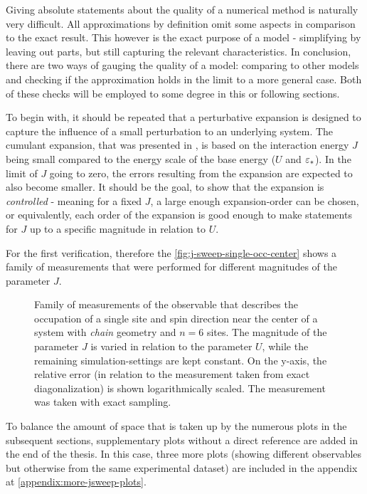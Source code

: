 Giving absolute statements about the quality of a numerical method is naturally very difficult.
All approximations by definition omit some aspects in comparison to the exact result.
This however is the exact purpose of a model - simplifying by leaving out parts, but still capturing the relevant characteristics.
In conclusion, there are two ways of gauging the quality of a model: comparing to other models and checking if the approximation holds in the limit to a more general case.
Both of these checks will be employed to some degree in this or following sections.

To begin with, it should be repeated that a perturbative expansion is designed to capture the influence of a \glqq small\grqq{} perturbation to an underlying system.
The cumulant expansion, that was presented in , is based on the interaction energy $J$ being small compared to the energy scale of the base energy ($U$ and $\epsl[\ast]$).
In the limit of $J$ going to zero, the errors resulting from the expansion are expected to also become smaller.
It should be the goal, to show that the expansion is \emph{controlled} - meaning for a fixed $J$, a large enough expansion-order can be chosen, or equivalently, each order of the expansion is good enough to make statements for $J$ up to a specific magnitude in relation to $U$. 

For the first verification, therefore the \autoref{fig:j-sweep-single-occ-center} shows a family of measurements that were performed for different magnitudes of the parameter $J$.

\begin{figure}[htbp]
    \centering
    \vspace{-0.7cm}
    \caption{
            Family of measurements of the observable that describes the occupation of a single site and spin direction near the center of a system with \emph{chain} geometry and $n=6$ sites.
            The magnitude of the parameter $J$ is varied in relation to the parameter $U$, while the remaining simulation-settings are kept constant.
            On the y-axis, the relative error (in relation to the measurement taken from exact diagonalization) is shown logarithmically scaled.
            The measurement was taken with exact sampling.
        }
    \label{fig:j-sweep-single-occ-center}
\end{figure}

To balance the amount of space that is taken up by the numerous plots in the subsequent sections, supplementary plots without a direct reference are added in the end of the thesis.
In this case, three more plots (showing different observables but otherwise from the same experimental dataset) are included in the appendix at \ref{appendix:more-jsweep-plots}.

